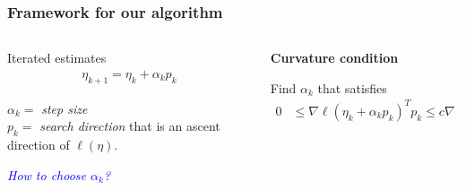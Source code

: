 \documentclass[ 10pt]{beamer}
\begin{document}
\frame
{
  \frametitle{Framework for our algorithm}
\begin{columns}[]
\begin{column}[t]{0.35\textwidth}
{
Iterated estimates
\begin{align*}
	\eta_{k+1} = \eta_k + \alpha_k p_k
\end{align*}

$\alpha_k =$ \emph{step size}\\
$p_k = $ \emph{search direction} that
is an ascent direction of $\ell(\eta)$.
\vspace{10mm}

\textcolor{blue}{\emph{How to choose $\alpha_k$?}}
}
\end{column}

\begin{column}[T]{0.65\textwidth}
{
\pause

\textbf{Curvature condition}
\vspace{1mm}

Find $\alpha_k$ that satisfies
\begin{align*}
	 0 & \leq \nabla \ell( \eta_k + \alpha_k p_k)^T p_k \leq c \nabla \ell(\eta_k)^T 
p_k
\end{align*}
}
    \scalebox{.27}{}
\end{column}
\end{columns}
}

\end{document}
